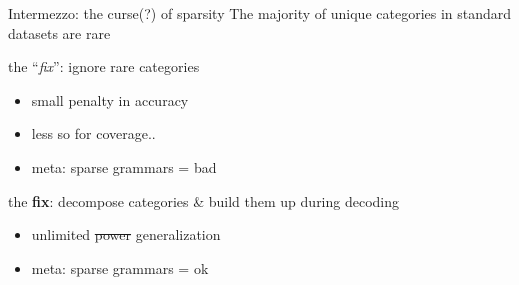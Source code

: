 \documentclass{beamer}
\begin{document}
\begin{frame}{Intermezzo: the curse(?) of sparsity}
    \smaller
    The majority of unique categories in standard datasets are \alert{rare}
    \vfill

    \pause
    the ``\textit{fix}'': ignore rare categories
    \begin{itemize}
        \item small penalty in accuracy
        \item less so for coverage..
        \item meta: sparse grammars = bad
    \end{itemize}
    
    \vfill
    
    \pause
    the \textbf{fix}: decompose categories \& build them up during decoding
    \begin{itemize}
        \item[\textcolor{blue}{\lightning}] unlimited \sout{power} generalization
        \item meta: sparse grammars = ok
    \end{itemize}
\end{frame}
\end{document}
